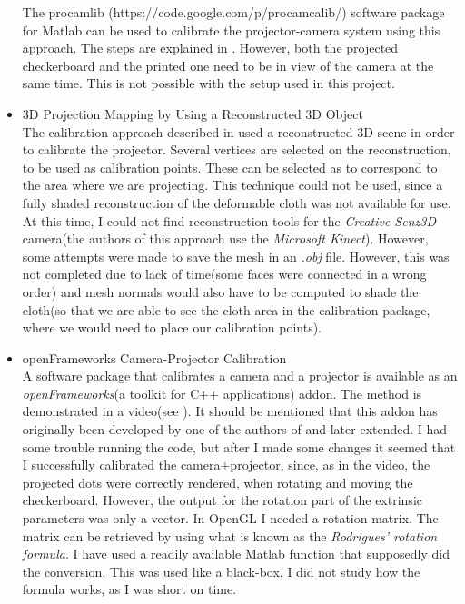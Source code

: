 \documentclass[]{article}
\begin{document}
\begin{itemize}
The procamlib (https://code.google.com/p/procamcalib/) software package for Matlab can be used to calibrate the projector-camera system using this approach. The steps are explained in \cite{falcao08}. However, both the projected checkerboard and the printed one need to be in view of the camera at the same time. This is not possible with the setup used in this project.\\
\item 3D Projection Mapping by Using a Reconstructed 3D Object\\

The calibration approach described in \cite{vvvv} used a reconstructed 3D scene in order to calibrate the projector. Several vertices are selected on the reconstruction, to be used as calibration points. These can be selected as to correspond to the area where we are projecting. This technique could not be used, since a fully shaded reconstruction of the deformable cloth was not available for use. At this time, I could not find reconstruction tools for the \textit{Creative Senz3D} camera(the authors of this approach use the \textit{Microsoft Kinect}). However, some attempts were made to save the mesh in an \textit{.obj} file. However, this was not completed due to lack of time(some faces were connected in a wrong order) and mesh normals would also have to be computed to shade the cloth(so that we are able to see the cloth area in the calibration package, where we would need to place our calibration points).
\item openFrameworks Camera-Projector Calibration\\

A software package that calibrates a camera and a projector is available as an \textit{openFrameworks}(a toolkit for C++ applications) addon. The method is demonstrated in a video(see \cite{ofx}). It should be mentioned that this addon has originally been developed by one of the authors of \cite{watanabe08} and later extended. I had some trouble running the code, but after I made some changes it seemed that I successfully calibrated the camera+projector, since, as in the video, the projected dots were correctly rendered, when rotating and moving the checkerboard. However, the output for the rotation part of the extrinsic parameters was only a vector. In OpenGL I needed a rotation matrix. The matrix can be retrieved by using what is known as the \textit{Rodrigues' rotation formula}. I have used a readily available Matlab function that supposedly did the conversion. This was used like a black-box, I did not study how the formula works, as I was short on time. 


\end{itemize}
\end{document}
